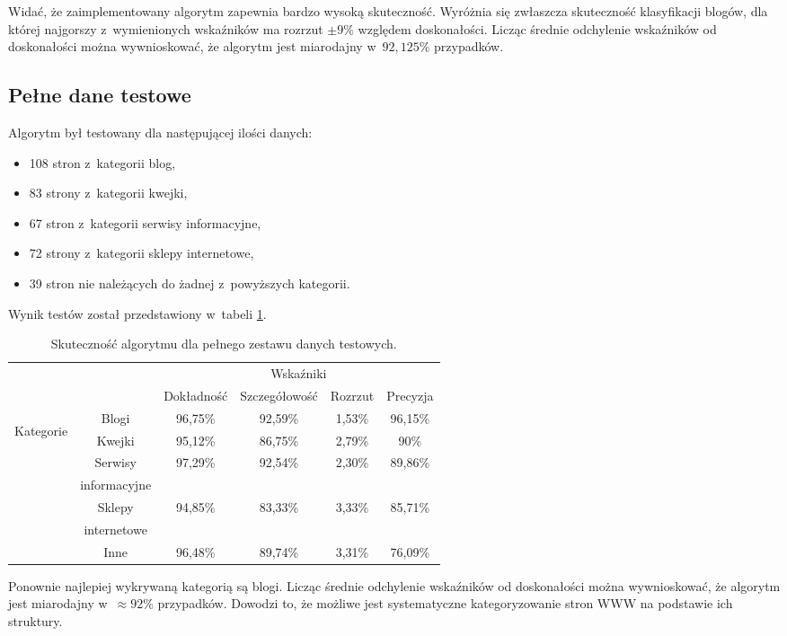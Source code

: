 \documentclass[a4paper,11pt]{article}
\begin{document}
Widać, że zaimplementowany algorytm zapewnia bardzo wysoką skuteczność. Wyróżnia się zwłaszcza skuteczność klasyfikacji blogów, dla której najgorszy z~wymienionych wskaźników ma rozrzut $\pm 9\%$ względem doskonałości. Licząc średnie odchylenie wskaźników od doskonałości można wywnioskować, że  algorytm jest miarodajny w~$92,125\%$ przypadków.

\subsection{Pełne dane testowe}

Algorytm był testowany dla następującej ilości danych:

\begin{itemize}
    \item 108 stron z~kategorii blog,
    \item 83 strony z~kategorii kwejki,
    \item 67 stron z~kategorii serwisy informacyjne,
    \item 72 strony z~kategorii sklepy internetowe,
    \item 39 stron nie należących do żadnej z~powyższych kategorii.
\end{itemize}

Wynik testów został przedstawiony w~tabeli \ref{tab:full_set_accuracy}.

\begin{table}[ht!]
\centering
    \begin{tabular}{| c | c | c | c | c | c |}
        \hline
        \multicolumn{2}{|c|}{} & \multicolumn{4}{c|}{Wskaźniki} \\
        \cline{3-6}
        \multicolumn{2}{|c|}{} & Dokładność & Szczegółowość & Rozrzut & Precyzja \\
        \hline
        \multirow{7}{*}{\begin{sideways}Kategorie \end{sideways}} & Blogi & 96,75\% & 92,59\% & 1,53\% & 96,15\% \\
        \cline{2-6}
        & Kwejki & 95,12\% & 86,75\% & 2,79\% & 90\% \\
        \cline{2-6}
        & Serwisy & \multirow{2}{*}{97,29\%} & \multirow{2}{*}{92,54\%} & \multirow{2}{*}{2,30\%} & \multirow{2}{*}{89,86\%} \\
        & informacyjne & & & & \\
        \cline{2-6}
        & Sklepy & \multirow{2}{*}{94,85\%} & \multirow{2}{*}{83,33\%} & \multirow{2}{*}{3,33\%} & \multirow{2}{*}{85,71\%} \\
        & internetowe & & & & \\
        \cline{2-6}
        & Inne & 96,48\% & 89,74\% & 3,31\% & 76,09\% \\
        \hline
    \end{tabular}
    \caption{Skuteczność algorytmu dla pełnego zestawu danych testowych.}
    \label{tab:full_set_accuracy}
\end{table}

Ponownie najlepiej wykrywaną kategorią są blogi. Licząc średnie odchylenie wskaźników od doskonałości można wywnioskować, że algorytm jest miarodajny w~$\approx 92\%$ przypadków. Dowodzi to, że możliwe jest systematyczne kategoryzowanie stron WWW na podstawie ich struktury.
\end{document}
